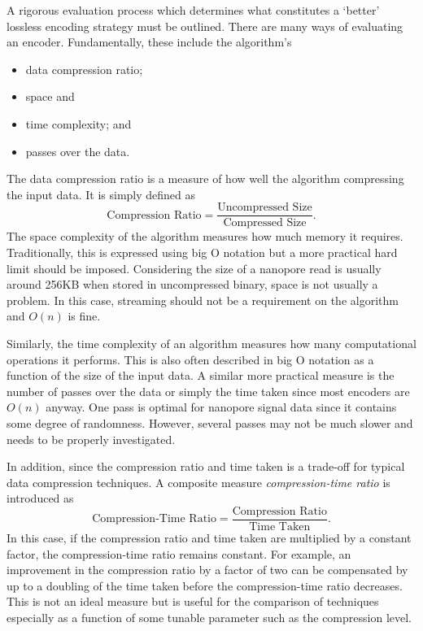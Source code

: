 A rigorous evaluation process which determines what constitutes a `better' lossless encoding strategy must be outlined. There are many ways of evaluating an encoder. Fundamentally, these include the algorithm's
\begin{itemize}
\item data compression ratio;
\item space and
\item time complexity; and
\item passes over the data.
\end{itemize}
The data compression ratio is a measure of how well the algorithm compressing the input data. It is simply defined as \[\text{Compression Ratio} = \frac{\text{Uncompressed Size}}{\text{Compressed Size}}.\] The space complexity of the algorithm measures how much memory it requires. Traditionally, this is expressed using big O notation but a more practical hard limit should be imposed. Considering the size of a nanopore read is usually around 256KB when stored in uncompressed binary, space is not usually a problem. In this case, streaming should not be a requirement on the algorithm and $O(n)$ is fine.

Similarly, the time complexity of an algorithm measures how many computational operations it performs. This is also often described in big O notation as a function of the size of the input data. A similar more practical measure is the number of passes over the data or simply the time taken since most encoders are $O(n)$ anyway. One pass is optimal for nanopore signal data since it contains some degree of randomness. However, several passes may not be much slower and needs to be properly investigated.

In addition, since the compression ratio and time taken is a trade-off for typical data compression techniques. A composite measure \textit{compression-time ratio} is introduced as \[\text{Compression-Time Ratio}=\frac{\text{Compression Ratio}}{\text{Time Taken}}.\] In this case, if the compression ratio and time taken are multiplied by a constant factor, the compression-time ratio remains constant. For example, an improvement in the compression ratio by a factor of two can be compensated by up to a doubling of the time taken before the compression-time ratio decreases. This is not an ideal measure but is useful for the comparison of techniques especially as a function of some tunable parameter such as the compression level.

